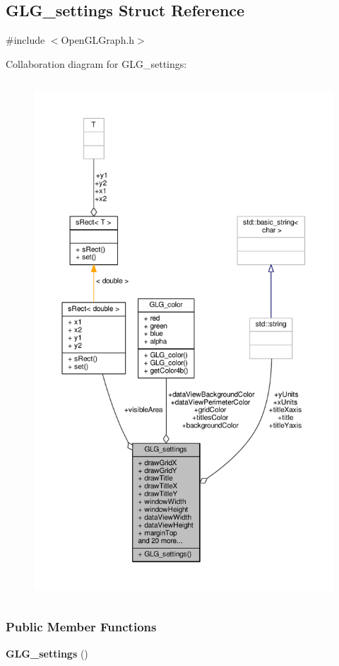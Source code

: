 \subsection{G\+L\+G\+\_\+settings Struct Reference}
\label{structGLG__settings}


{\ttfamily \#include $<$Open\+G\+L\+Graph.\+h$>$}



Collaboration diagram for G\+L\+G\+\_\+settings\+:
\nopagebreak
\begin{figure}[H]
\begin{center}
\leavevmode
\includegraphics[height=550pt]{d5/daf/structGLG__settings__coll__graph}
\end{center}
\end{figure}
\subsubsection*{Public Member Functions}
\begin{DoxyCompactItemize}
\item 
{\bf G\+L\+G\+\_\+settings} ()
\end{DoxyCompactItemize}
